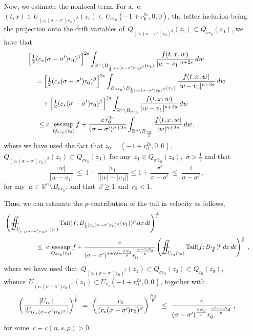 \documentclass[leqno,10pt]{amsart}
\theoremstyle{plain}
\theoremstyle{remark}
\numberwithin{equation}{section}
\DeclareMathOperator*{\tail}{{\rm Tail}}
\def\dx{\,{\rm d}x}
\def\dw{\,{\rm d}w}
\def\dt{\,{\rm d}t}
\def\ern{\mathbb{R}^n}
\def\Xiint#1{\mathchoice
    {\XXiint\displaystyle\textstyle{#1}}%
    {\XXiint\textstyle\scriptstyle{#1}}%
    {\XXiint\scriptstyle\scriptscriptstyle{#1}}%
    {\XXiint\scriptscriptstyle\scriptscriptstyle{#1}}%
    \!\iint}
\def\XXiint#1#2#3{\setbox0=\hbox{$#1{#2#3}{\iint}$}
    \vcenter{\hbox{$#2#3$}}\kern-0.5\wd0}
\def\biint{\Xiint{-\!-}}
\begin{document}
{Now, we estimate the nonlocal term.
  For a.~\!e.~$(t,x) \in U_{(c_*(\sigma-\sigma')r_{0})^\beta}(z_1) \subset U_{\sigma r_{0}}(-1+r_{0}^{2s},0,0)$, the latter inclusion being the projection onto the drift variables of~${Q}_{(c_*(\sigma-\sigma')r_{0})^\beta}(z_1) \subset {Q}_{\sigma r_{0}}(z_{0})$,  we have that
  $$
  \begin{aligned}
  &\Big[\displaystyle\tfrac{1}{2}(c_*(\sigma-\sigma')r_{0})^\beta\Big]^{2s} \int_{\ern \setminus B_{\frac{1}{2}(c_*(\sigma-\sigma')r_{0})^\beta}(v_1)}\frac{f(t,x,w)}{|w-v_1|^{n+2s}}\dw \\
  &\quad  =  \Big[\tfrac{1}{2}(c_*(\sigma-\sigma')r_{0})^\beta\Big]^{2s} \int_{B_{\sigma r_{0}} \setminus B_{\frac{1}{2}(c_*(\sigma-\sigma')r_{0})^\beta}(v_1)}\frac{f(t,x,w)}{|w-v_1|^{n+2s}}\dw \notag\\
  & \qquad   +  \Big[\tfrac{1}{2}(c_*(\sigma-\sigma')r_{0})^\beta\Big]^{2s} \int_{\ern \setminus B_{\sigma r_{0}}}\frac{f(t,x,w)}{|w-v_1|^{n+2s}}\dw\\
  & \quad\ \leq c\,  \,\operatorname*{ess\,sup}_{{Q}_{\sigma r_{0}}(z_{0})}f + \frac{c\,r_{0}^{2s}}{(\sigma-\sigma')^{n+2s}}\int_{\ern \setminus B_\frac{r_{0}}{2}}\frac{f(t,x,w)}{|w|^{n+2s}}\dw,
  \end{aligned}
  $$
  where we have used the fact that {$z_0=(-1+r_0^{2s}, 0,0)$,}~${Q}_{(c_*(\sigma-\sigma')r_{0})^\beta}(z_1) \subset {Q}_{\sigma r_{0}}(z_{0})$ for any~$z_1 \in {Q}_{\sigma'r_{0}}(z_{0})$,~$\sigma > \frac{1}{2}$ and that
  \[
  \frac{|w|}{|w-v_1|} \ \leq \ 1 +\frac{|v_1|}{\left||w|-|v_1|\right|} \leq 1 + \frac{\sigma'}{\sigma-\sigma'} \  \leq \  \frac{1}{\sigma-\sigma'}\,,
  \]
for any~$w \in \ern \setminus B_{\sigma r_{0}}$, and that~$\beta \geq 1$ and~$r_{0}<1$. 
  

  Thus, we can estimate the $p$-contribution of the tail in velocity as follows,
  \begin{equation}\label{eq:tail-est-ref-bdd}
  \begin{aligned}
  	&\left(\biint_{U_{(c_*(\sigma-\sigma')r_{0})^\beta}(z_1)} \tail(f; B_{\frac{1}{2}(c_*(\sigma-\sigma')r_{0})^\beta}(v_1))^{p}\dx\dt\right)^\frac{1}{p}\\
  	&\qquad\qquad  \quad  \leq \   c\, \operatorname*{ess\,sup}_{{Q}_{\sigma r_{0}}(z_{0})}f  + \frac{c}{(\sigma-\sigma')^{n+2s+\frac{\beta N_{\rm d}}{p}}  { r_0^{\frac{(\beta - 1)N_d}{p} }}}    \left(\biint_{U_{r_{0}}({z_0})}\tail(f; B_\frac{r_{0}}{2})^{p}\dx\dt\right)^\frac{1}{p}\,,
  \end{aligned}
  \end{equation}
  where we have used that~${Q}_{(c_*(\sigma-\sigma')r_{0})^\beta}(z_1) \subset {Q}_{\sigma r_{0}}(z_{0})\subset {Q}_{r_{0}}(z_{0})$, whence~$U_{(c_*(\sigma-\sigma')r_{0})^\beta}(z_1)\subset U_{r_{0}}(-1+r_{0}^{2s},0,0)$, together with
 $$
  \left(\frac{|U_{r_{0}}|}{|U_{(c_*(\sigma-\sigma')r_{0})^\beta}|}\right)^\frac{1}{p} \ = \ \left(\frac{r_{0}}{(c_*(\sigma-\sigma')r_{0})^\beta}\right)^\frac{N_{\rm d}}{p} \ \leq \ \frac{c}{(\sigma-\sigma')^{\frac{\beta N_{\rm d}}{p}}  { r_0^{\frac{(\beta - 1)N_d}{p} }}} \,,
 $$
  for some~$c\equiv c(n,s,p)>0$.

}
\end{document}
